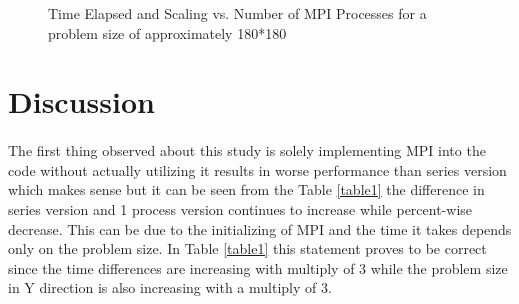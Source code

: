 \documentclass{report}
\begin{document}
\begin{figure}[H]
  \centering
  \caption{Time Elapsed and Scaling vs. Number of MPI Processes for a problem size of approximately 180*180}
  \label{fig:mpi_time_scaling_graph}
\end{figure}



\newpage
\section{Discussion}
\paragraph{}
The first thing observed about this study is solely implementing MPI into the code without actually utilizing it results in worse performance than series version which makes sense but it can be seen from the Table \ref{table1} the difference in series version and 1 process version continues to increase while percent-wise decrease. This can be due to the initializing of MPI and the time it takes depends only on the problem size. In Table \ref{table1} this statement proves to be correct since the time differences are increasing with multiply of 3 while the problem size in Y direction is also increasing with a multiply of 3.
\end{document}
